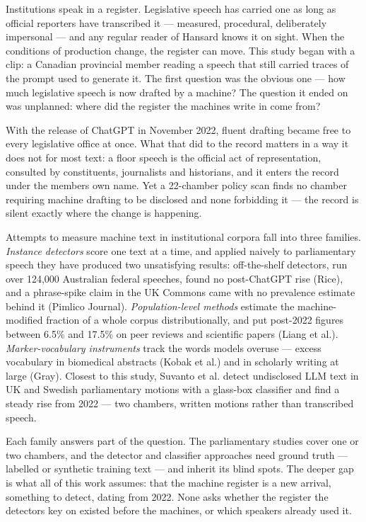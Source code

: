 Institutions speak in a register. Legislative speech has carried one as long
as official reporters have transcribed it --- measured, procedural, deliberately
impersonal --- and any regular reader of Hansard knows it on sight. When the
conditions of production change, the register can move. This study began with
a clip: a Canadian provincial member reading a speech that still carried
traces of the prompt used to generate it. The first question was the obvious
one --- how much legislative speech is now drafted by a machine? The question it
ended on was unplanned: where did the register the machines write in come
from?

With the release of ChatGPT in November 2022, fluent drafting became free to
every legislative office at once. What that did to the record matters in a way
it does not for most text: a floor speech is the official act of
representation, consulted by constituents, journalists and historians, and it
enters the record under the member\textquotesingle s own name. Yet a 22-chamber policy scan
finds no chamber requiring machine drafting to be disclosed and none
forbidding it --- the record is silent exactly where the change is happening.

Attempts to measure machine text in institutional corpora fall into three
families. \emph{Instance detectors} score one text at a time, and applied naively to
parliamentary speech they have produced two unsatisfying results: off-the-shelf
detectors, run over 124,000 Australian federal speeches, found no post-ChatGPT rise (Rice\cite{rice2026}), and a phrase-spike claim in the UK Commons came with no prevalence
estimate behind it (Pimlico Journal\cite{pimlico2025}). \emph{Population-level methods} estimate the
machine-modified fraction of a whole corpus distributionally, and put post-2022
figures between 6.5\% and 17.5\% on peer reviews and scientific papers (Liang et al.\cite{liang2024monitoring,liang2025quantifying}). \emph{Marker-vocabulary instruments} track the words models overuse --- excess
vocabulary in biomedical abstracts (Kobak et al.\cite{kobak2025}) and in scholarly writing at large (Gray\cite{gray2025}). Closest to this study, Suvanto et al.\cite{suvanto2026} detect undisclosed LLM
text in UK and Swedish parliamentary motions with a glass-box classifier and
find a steady rise from 2022 --- two chambers, written motions rather than
transcribed speech.

Each family answers part of the question. The parliamentary studies cover one
or two chambers, and the detector and classifier approaches need ground
truth --- labelled or synthetic training text --- and inherit its blind spots.
The deeper gap is what all of this work assumes: that the machine register is
a new arrival, something to detect, dating from 2022. None asks whether the
register the detectors key on existed before the machines, or which speakers
already used it.

